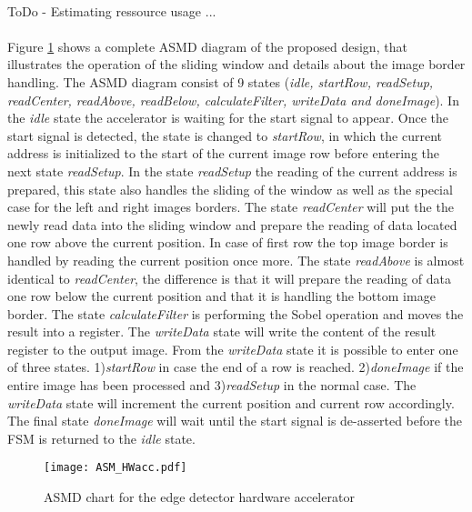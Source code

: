 \paragraph*{}
ToDo - Estimating ressource usage ...

\paragraph*{}
Figure \ref{fig:ASM_HW} shows a complete ASMD diagram of the proposed design, that illustrates the operation of the sliding window and details about the image border handling. The ASMD diagram consist of 9 states (\emph{idle, startRow, readSetup, readCenter, readAbove, readBelow, calculateFilter, writeData and doneImage}).
In the \emph{idle} state the accelerator is waiting for the start signal to appear. Once the start signal is detected, the state is changed to \emph{startRow}, in which the current address is initialized to the start of the current image row before entering the next state \emph{readSetup}. In the state \emph{readSetup} the reading of the current address is prepared, this state also handles the sliding of the window as well as the special case for the left and right images borders. The state \emph{readCenter} will put the the newly read data into the sliding window and prepare the reading of data located one row above the current position. In case of first row the top image border is handled by reading the current position once more. The state \emph{readAbove} is almost identical to \emph{readCenter}, the difference is that it will prepare the reading of data one row below the current position and that it is handling the bottom image border. The state \emph{calculateFilter} is performing the Sobel operation and moves the result into a register. The \emph{writeData} state will write the content of the result register to the output image. From the \emph{writeData} state it is possible to enter one of three states. 1)\emph{startRow} in case the end of a row is reached. 2)\emph{doneImage} if the entire image has been processed and 3)\emph{readSetup} in the normal case.
The \emph{writeData} state will increment the current position and current row accordingly. The final state \emph{doneImage} will wait until the start signal is de-asserted before the FSM is returned to the \emph{idle} state.

\begin{figure}[H]
	\centering
	\texttt{[image: ASM\_HWacc.pdf]}
	\caption{ASMD chart for the edge detector hardware accelerator}
	\label{fig:ASM_HW}
\end{figure}

